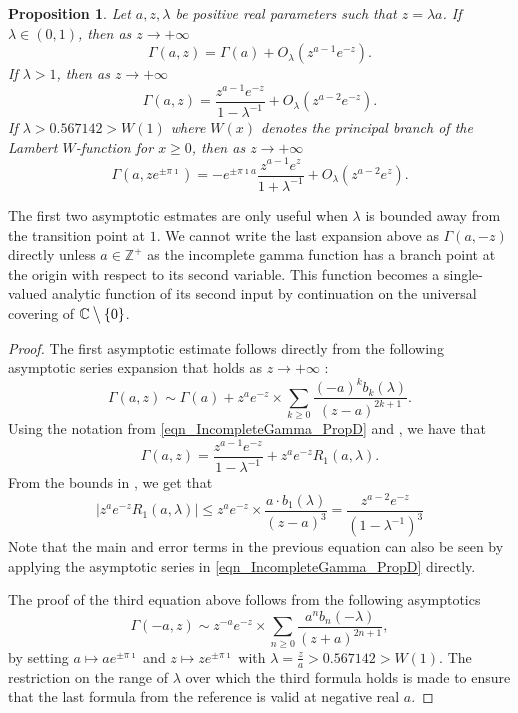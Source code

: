 \documentclass[11pt,reqno,a4letter]{article}
\numberwithin{figure}{section}
\numberwithin{table}{section}
\theoremstyle{plain}
\newtheorem{prop}[theorem]{Proposition}
\numberwithin{theorem}{section}
\theoremstyle{definition}
\begin{document}
\begin{prop}
\label{prop_IncGammaLambdaTypeBounds_v1}
Let $a,z,\lambda$ be positive real parameters such that $z=\lambda a$. 
If $\lambda \in (0, 1)$, then as $z \rightarrow +\infty$ 
\[
\Gamma(a, z) = \Gamma(a) + O_{\lambda}\left(z^{a-1} e^{-z}\right). 
\]
If $\lambda > 1$, then as 
$z \rightarrow +\infty$ 
\[
\Gamma(a, z) = \frac{z^{a-1} e^{-z}}{1-\lambda^{-1}} + O_{\lambda}\left(z^{a-2} e^{-z}\right). 
\]
If $\lambda > 0.567142 > W(1)$ where $W(x)$ denotes the principal branch of the 
Lambert $W$-function for $x \geq 0$, 
then as $z \rightarrow +\infty$ 
\[
\Gamma(a, z e^{\pm\pi\imath}) = -e^{\pm \pi\imath a} \frac{z^{a-1} e^{z}}{1 + \lambda^{-1}} + 
     O_{\lambda}\left(z^{a-2} e^{z}\right). 
\]
\end{prop}
The first two asymptotic estmates are only useful when $\lambda$ is bounded away from the 
transition point at $1$. 
We cannot write the last expansion above 
as $\Gamma(a, -z)$ directly unless $a \in \mathbb{Z}^{+}$ 
as the incomplete gamma function 
has a branch point at the origin with respect to its second variable. 
This function becomes a single-valued 
analytic function of its second input by continuation 
on the universal covering of $\mathbb{C} \mathbin{\big\backslash} \{0\}$. 
\begin{proof}
The first asymptotic estimate follows directly from the following 
asymptotic series expansion that holds as $z \rightarrow +\infty$ 
\cite[Eq.\ (2.1)]{NEMES2019}: 
\[
\Gamma(a, z) \sim \Gamma(a) + z^a e^{-z} \times \sum_{k \geq 0} 
     \frac{(-a)^k b_k(\lambda)}{(z-a)^{2k+1}}. 
\]
Using the notation from \eqref{eqn_IncompleteGamma_PropD} and \cite{NEMES2016}, 
we have that 
\[
\Gamma(a, z) = \frac{z^{a-1} e^{-z}}{1-\lambda^{-1}} + z^{a} e^{-z} R_1(a, \lambda). 
\]
From the bounds in \cite[\S 3.1]{NEMES2016}, we get that 
\[
\left\lvert z^{a} e^{-z} R_1(a, \lambda) \right\rvert \leq 
     z^a e^{-z} \times \frac{a \cdot b_1(\lambda)}{(z-a)^{3}} = 
     \frac{z^{a-2} e^{-z}}{(1-\lambda^{-1})^{3}}
\]
Note that the main and error terms in the previous equation can also be 
seen by applying the asymptotic series in 
\eqref{eqn_IncompleteGamma_PropD} directly. 

The proof of the third equation above follows from the following asymptotics 
\cite[Eq.\ (1.1)]{NEMES2015C}
\[
\Gamma(-a, z) \sim z^{-a} e^{-z} \times \sum_{n \geq 0} \frac{a^n b_n(-\lambda)}{(z+a)^{2n+1}}, 
\]
by setting $a \mapsto a e^{\pm \pi\imath}$ and $z \mapsto z e^{\pm \pi\imath}$ with 
$\lambda = \frac{z}{a} > 0.567142 > W(1)$. 
The restriction on the range of $\lambda$ over which the third formula holds is made to ensure that 
the last formula from the reference is valid at negative real $a$. 
\end{proof}
\end{document}
